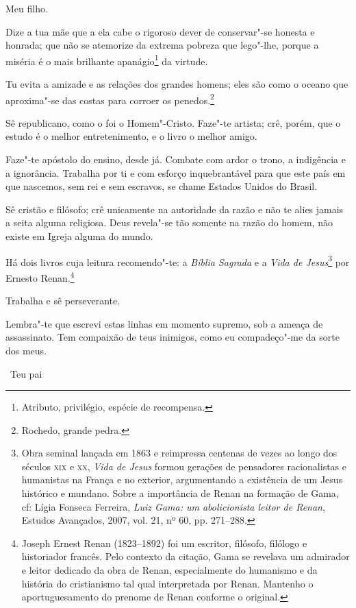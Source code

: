 Meu filho.

Dize a tua mãe que a ela cabe o rigoroso dever de conservar"-se honesta e
honrada; que não se atemorize da extrema pobreza que lego"-lhe, porque a
miséria é o mais brilhante apanágio\footnote{Atributo, privilégio,
  espécie de recompensa.} da virtude.

Tu evita a amizade e as relações dos grandes homens; eles são como o
oceano que aproxima"-se das costas para corroer os penedos.\footnote{
  Rochedo, grande pedra.}

Sê republicano, como o foi o Homem"-Cristo. Faze"-te artista; crê, porém,
que o estudo é o melhor entretenimento, e o livro o melhor amigo.

Faze"-te apóstolo do ensino, desde já. Combate com ardor o trono, a
indigência e a ignorância. Trabalha por ti e com esforço inquebrantável
para que este país em que nascemos, sem rei e sem escravos, se chame
Estados Unidos do Brasil.

Sê cristão e filósofo; crê unicamente na autoridade da razão e não te
alies jamais a seita alguma religiosa. Deus revela"-se tão somente na
razão do homem, não existe em Igreja alguma do mundo.

Há dois livros cuja leitura recomendo"-te: a \emph{Bíblia Sagrada} e a
\emph{Vida de Jesus}\footnote{Obra seminal lançada em 1863 e
  reimpressa centenas de vezes ao longo dos séculos \textsc{xix} e \textsc{xx}, \emph{Vida
  de Jesus} formou gerações de pensadores racionalistas e humanistas na
  França e no exterior, argumentando a existência de um Jesus histórico
  e mundano. Sobre a importância de Renan na formação de Gama, cf: Lígia
  Fonseca Ferreira, \emph{Luiz Gama: um abolicionista leitor de Renan},
  Estudos Avançados, 2007, vol. 21, nº 60, pp. 271--288.} por Ernesto
Renan.\footnote{Joseph Ernest Renan (1823--1892) foi um escritor,
  filósofo, filólogo e historiador francês. Pelo contexto da citação,
  Gama se revelava um admirador e leitor dedicado da obra de Renan,
  especialmente do humanismo e da história do cristianismo tal qual
  interpretada por Renan. Mantenho o aportuguesamento do prenome de
  Renan conforme o original.}

Trabalha e sê perseverante.

Lembra"-te que escrevi estas linhas em momento supremo, sob a ameaça de
assassinato. Tem compaixão de teus inimigos, como eu compadeço"-me da
sorte dos meus.

\vfill

\hfill\ Teu pai

